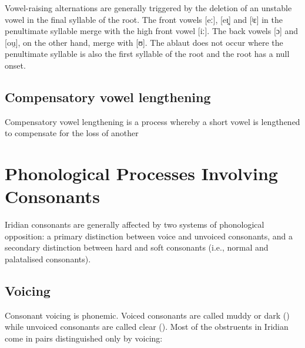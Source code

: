\ex
{}
\xe

Vowel-raising alternations are generally triggered by the deletion of an
unstable vowel in the final syllable of the root. The front vowels [eː], [eɪ̯]
and [ʲɛ] in the penultimate syllable merge with the high front vowel [iː]. The
back vowels [ɔ] and [ou̯], on the other hand, merge with [ʊ]. The ablaut does
not occur where the penultimate syllable is also the first syllable of the root
and the root has a null onset.

\ex
{}
\xe


\subsection{Compensatory vowel lengthening}

Compensatory vowel lengthening is a process whereby a short vowel is lengthened
to compensate for the loss of another 

\section{Phonological Processes Involving Consonants}

Iridian consonants are generally affected by two systems of phonological
opposition: a primary distinction between voice and unvoiced consonants, and a
secondary distinction between hard and soft consonants (i.e., normal and
palatalised consonants).

\subsection{Voicing}
Consonant voicing is phonemic. Voiced consonants are called muddy or dark
() while unvoiced consonants are called clear ().
Most of the obstruents in Iridian come in pairs distinguished only by voicing:

